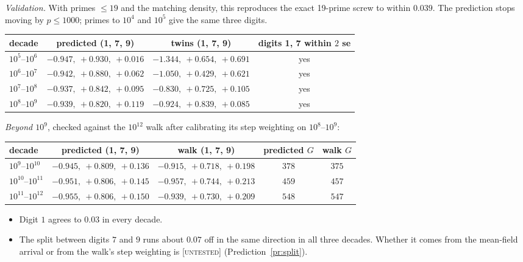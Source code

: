 \documentclass[11pt]{article}
\theoremstyle{definition}
\theoremstyle{remark}
\newcommand{\grade}[1]{\textsc{[#1]}}
\begin{document}
\noindent\emph{Validation.} With primes $\le19$ and the matching density, this reproduces the exact 19-prime screw to within $0.039$. The prediction stops moving by $p\le1000$; primes to $10^4$ and $10^5$ give the same three digits.

\begin{center}
\begin{tabular}{lccc}
\toprule
decade & predicted (1, 7, 9) & twins (1, 7, 9) & digits 1, 7 within $2$ se\\
\midrule
$10^5$--$10^6$ & $-0.947,\ +0.930,\ +0.016$ & $-1.344,\ +0.654,\ +0.691$ & yes\\
$10^6$--$10^7$ & $-0.942,\ +0.880,\ +0.062$ & $-1.050,\ +0.429,\ +0.621$ & yes\\
$10^7$--$10^8$ & $-0.937,\ +0.842,\ +0.095$ & $-0.830,\ +0.725,\ +0.105$ & yes\\
$10^8$--$10^9$ & $-0.939,\ +0.820,\ +0.119$ & $-0.924,\ +0.839,\ +0.085$ & yes\\
\bottomrule
\end{tabular}
\end{center}

\noindent\emph{Beyond $10^9$}, checked against the $10^{12}$ walk after calibrating its step weighting on $10^8$--$10^9$:

\begin{center}
\begin{tabular}{lcccc}
\toprule
decade & predicted (1, 7, 9) & walk (1, 7, 9) & predicted $G$ & walk $G$\\
\midrule
$10^9$--$10^{10}$ & $-0.945,\ +0.809,\ +0.136$ & $-0.915,\ +0.718,\ +0.198$ & $378$ & $375$\\
$10^{10}$--$10^{11}$ & $-0.951,\ +0.806,\ +0.145$ & $-0.957,\ +0.744,\ +0.213$ & $459$ & $457$\\
$10^{11}$--$10^{12}$ & $-0.955,\ +0.806,\ +0.150$ & $-0.939,\ +0.730,\ +0.209$ & $548$ & $547$\\
\bottomrule
\end{tabular}
\end{center}

\begin{itemize}
\item Digit $1$ agrees to $0.03$ in every decade.
\item The split between digits $7$ and $9$ runs about $0.07$ off in the same direction in all three decades. Whether it comes from the mean-field arrival or from the walk's step weighting is \grade{untested} (Prediction~\ref{pr:split}).
\end{itemize}
\end{document}
